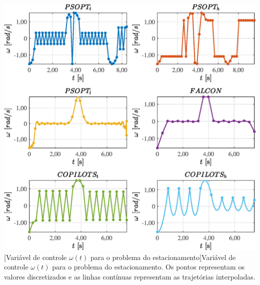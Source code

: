 \noindent
\begin{minipage}{\textwidth}
	\vspace{\onelineskip}
	\centering
	\includegraphics[scale=0.7]{fig/resultados/estacionamento/traj/u/omega}
	[Variável de controle  $\omega(t)$ para o problema do estacionamento]{Variável de controle  $\omega(t)$ para o problema do estacionamento. Os pontos representam os valores discretizados e as linhas contínuas representam as trajetórias interpoladas.}
	\label{fig:estacionamento:u:omega}
	\vspace{\onelineskip}
\end{minipage}


